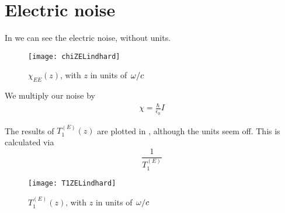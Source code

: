 \documentclass[11pt]{article}
\begin{document}
	\section{Electric noise} \label{sec:ElectricNoise}
	In  we can see the electric noise, without units.
	\begin{figure}[htp]
		\centering
		\texttt{[image: chiZELindhard]}
		\caption{$\chi_{EE}(z)$, with $z$ in units of $\flatfrac{\omega}{c}$} \label{fig:chizee}
	\end{figure}
	We multiply our noise by
	\begin{align}
		\chi = \frac{\hbar}{\epsilon_0} I
	\end{align}

	The results of $T_1^{(E)}(z)$ are plotted in , although the units seem off.
	This is calculated via
	\begin{equation}
		\frac{1}{T_1^{(E)}}
	\end{equation}
	\begin{figure}[htp]
		\centering
		\texttt{[image: T1ZELindhard]}
		\caption{$T_{1}^{(E)}(z)$, with $z$ in units of $\flatfrac{\omega}{c}$} \label{fig:t1ez}
	\end{figure}

	\newpage
	\listoftodos
	\newpage
	\printbibliography
\end{document}
